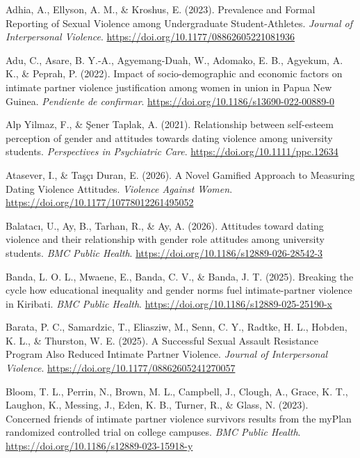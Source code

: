 \documentclass[
  spanish,
  11pt,
  letterpaper,
  DIV=11,
  numbers=noendperiod]{scrreprt}
\newlength{\cslhangindent}
\newenvironment{CSLReferences}[2] %
 {\begin{list}{}{%
  \setlength{\itemindent}{0pt}
  \setlength{\leftmargin}{0pt}
  \setlength{\parsep}{0pt}
  \ifodd #1
   \setlength{\leftmargin}{\cslhangindent}
   \setlength{\itemindent}{-1\cslhangindent}
  \fi
  \setlength{\itemsep}{#2\baselineskip}}}
 {\end{list}}
\begin{document}
\protect{}\label{refs}
\begin{CSLReferences}{1}{0}
Adhia, A., Ellyson, A. M., \& Kroshus, E. (2023). Prevalence and Formal
Reporting of Sexual Violence among Undergraduate Student-Athletes.
\emph{Journal of Interpersonal Violence}.
\url{https://doi.org/10.1177/08862605221081936}

Adu, C., Asare, B. Y.-A., Agyemang-Duah, W., Adomako, E. B., Agyekum, A.
K., \& Peprah, P. (2022). Impact of socio-demographic and economic
factors on intimate partner violence justification among women in union
in Papua New Guinea. \emph{Pendiente de confirmar}.
\url{https://doi.org/10.1186/s13690-022-00889-0}

Alp Yilmaz, F., \& Şener Taplak, A. (2021). Relationship between
self-esteem perception of gender and attitudes towards dating violence
among university students. \emph{Perspectives in Psychiatric Care}.
\url{https://doi.org/10.1111/ppc.12634}

Atasever, I., \& Taşçı Duran, E. (2026). A Novel Gamified Approach to
Measuring Dating Violence Attitudes. \emph{Violence Against Women}.
\url{https://doi.org/10.1177/10778012261495052}

Balatacı, U., Ay, B., Tarhan, R., \& Ay, A. (2026). Attitudes toward
dating violence and their relationship with gender role attitudes among
university students. \emph{BMC Public Health}.
\url{https://doi.org/10.1186/s12889-026-28542-3}

Banda, L. O. L., Mwaene, E., Banda, C. V., \& Banda, J. T. (2025).
Breaking the cycle how educational inequality and gender norms fuel
intimate-partner violence in Kiribati. \emph{BMC Public Health}.
\url{https://doi.org/10.1186/s12889-025-25190-x}

Barata, P. C., Samardzic, T., Eliasziw, M., Senn, C. Y., Radtke, H. L.,
Hobden, K. L., \& Thurston, W. E. (2025). A Successful Sexual Assault
Resistance Program Also Reduced Intimate Partner Violence. \emph{Journal
of Interpersonal Violence}.
\url{https://doi.org/10.1177/08862605241270057}

Bloom, T. L., Perrin, N., Brown, M. L., Campbell, J., Clough, A., Grace,
K. T., Laughon, K., Messing, J., Eden, K. B., Turner, R., \& Glass, N.
(2023). Concerned friends of intimate partner violence survivors results
from the myPlan randomized controlled trial on college campuses.
\emph{BMC Public Health}.
\url{https://doi.org/10.1186/s12889-023-15918-y}


\end{CSLReferences}
\end{document}
